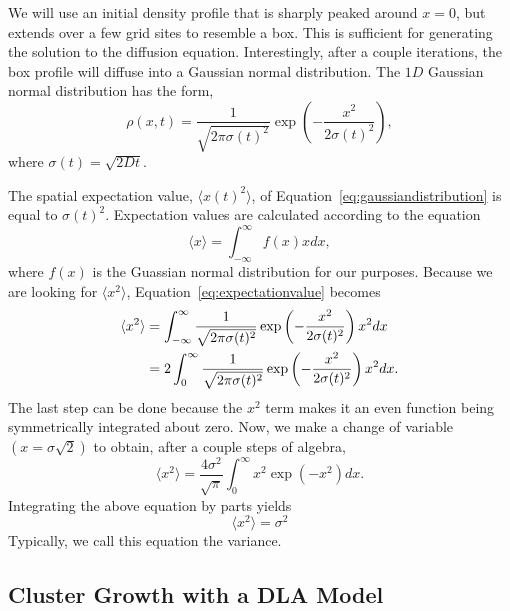 \documentclass[10pt]{article}
\begin{document}
We will use an initial density profile that is sharply peaked around $x=0$, but extends over a few grid sites to resemble a box. This is sufficient for generating the solution to the diffusion equation. Interestingly, after a couple iterations, the box profile will diffuse into a Gaussian normal distribution. The $1D$ Gaussian normal distribution has the form,
\begin{equation}
  \label{eq:gaussiandistribution}
  \rho(x,t) = \frac{1}{\sqrt{2\pi\sigma(t)^2}}\exp\left(-\frac{x^2}{2\sigma(t)^2}\right),
\end{equation}
where $\sigma(t) = \sqrt{2Dt}$.

The spatial expectation value, $\langle x(t)^2\rangle$, of Equation~\ref{eq:gaussiandistribution} is equal to $\sigma(t)^2$. Expectation values are calculated according to the equation
\begin{equation}
  \label{eq:expectationvalue}
  \langle x\rangle = \int_{-\infty}^\infty f(x)xdx,
\end{equation}
where $f(x)$ is the Guassian normal distribution for our purposes. Because we are looking for $\langle x^2\rangle$, Equation~\ref{eq:expectationvalue} becomes
\begin{align}
  \label{eq:spatialexpectationvalueintegral}
  \langle x^2\rangle &= \int_{-\infty}^\infty \frac{1}{\sqrt{2\pi\sigma(t)^2}}\exp\left(-\frac{x^2}{2\sigma(t)^2}\right) x^2 dx \notag \\
  &= 2\int_{0}^\infty \frac{1}{\sqrt{2\pi\sigma(t)^2}}\exp\left(-\frac{x^2}{2\sigma(t)^2}\right) x^2 dx.
\end{align}
The last step can be done because the $x^2$ term makes it an even function being symmetrically integrated about zero. Now, we make a change of variable $(x=\sigma\sqrt{2})$ to obtain, after a couple steps of algebra,
\begin{equation}
  \label{eq:spatialexpectationvalue-simplified}
  \langle x^2\rangle = \frac{4\sigma^2}{\sqrt{\pi}}\int_0^\infty x^2 \exp(-x^2)dx.
\end{equation}
Integrating the above equation by parts yields
\begin{equation}
  \label{eq:variancesolved}
  \langle x^2 \rangle = \sigma^2
\end{equation}
Typically, we call this equation the variance. %

\subsection{Cluster Growth with a DLA Model}
\label{sec:clusterDLAmodel}
\end{document}
